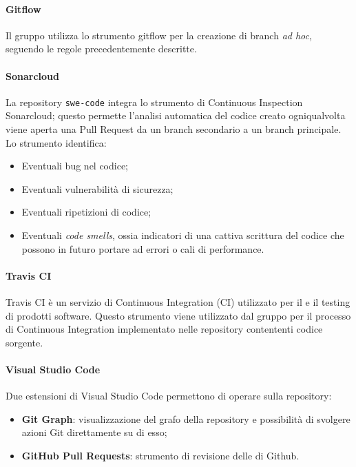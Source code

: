 \documentclass[../norme-di-progetto.tex]{subfiles}
\begin{document}
\paragraph{Gitflow}
Il gruppo utilizza lo strumento gitflow per la creazione di branch \textit{ad hoc}, seguendo le regole precedentemente descritte.

\paragraph{Sonarcloud}
La repository \texttt{swe-code} integra lo strumento di Continuous Inspection Sonarcloud; questo permette l'analisi automatica del codice creato ogniqualvolta viene aperta una Pull Request da un branch secondario a un branch principale. \\
Lo strumento identifica:
\begin{itemize}
  \item Eventuali bug nel codice;
  \item Eventuali vulnerabilità di sicurezza;
  \item Eventuali ripetizioni di codice;
  \item Eventuali \textit{code smells}, ossia indicatori di una cattiva scrittura del codice che possono in futuro portare ad errori o cali di performance.
\end{itemize}

\paragraph{Travis CI}
Travis CI è un servizio di Continuous Integration (CI) utilizzato per il  e il testing di prodotti software. Questo strumento viene utilizzato dal gruppo per il processo di Continuous Integration implementato nelle repository contententi codice sorgente.

\paragraph{Visual Studio Code}
Due estensioni di Visual Studio Code permettono di operare sulla repository:
\begin{itemize}
  \item \textbf{Git Graph}: visualizzazione del grafo della repository e possibilità di svolgere azioni Git direttamente su di esso;
  \item \textbf{GitHub Pull Requests}: strumento di revisione delle  di Github.
\end{itemize}
\end{document}
